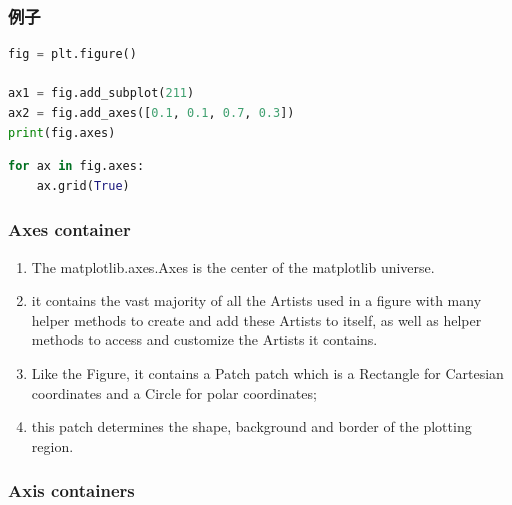\documentclass[UTF8,a4paper,12pt]{ctexart}  %
\providecommand{\tightlist}{\setlength{\itemsep}{0pt}\setlength{\parskip}{0pt}}
\begin{document}
\hypertarget{ux4f8bux5b50-4}{%
\subsubsection{例子}\label{ux4f8bux5b50-4}}

\begin{lstlisting}[language=Python]
fig = plt.figure()

ax1 = fig.add_subplot(211)
ax2 = fig.add_axes([0.1, 0.1, 0.7, 0.3])
print(fig.axes)
\end{lstlisting}

\begin{lstlisting}[language=Python]
for ax in fig.axes:
    ax.grid(True)
\end{lstlisting}

\hypertarget{axes-container}{%
\subsubsection{Axes container}\label{axes-container}}

\begin{enumerate}
\def\labelenumi{\arabic{enumi}.}
\tightlist
\item
  The matplotlib.axes.Axes is the center of the matplotlib universe.
\item
  it contains the vast majority of all the Artists used in a figure
  with many helper methods to create and add these Artists to itself,
  as well as helper methods to access and customize the Artists it
  contains.
\item
  Like the Figure, it contains a Patch patch which is a Rectangle for
  Cartesian coordinates and a Circle for polar coordinates;
\item
  this patch determines the shape, background and border of the
  plotting region.
\end{enumerate}

\hypertarget{axis-containers}{%
\subsubsection{Axis containers}\label{axis-containers}}
\end{document}
